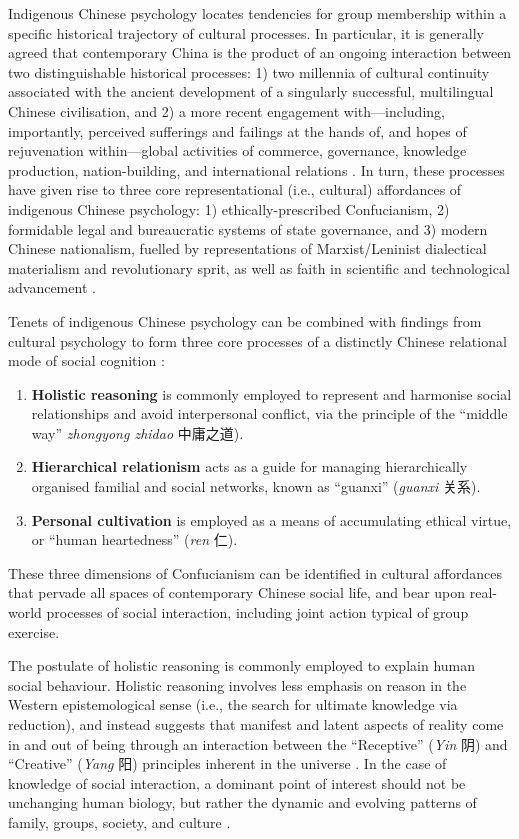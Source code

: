 \begin{CJK}{UTF8}{gbsn}
Indigenous Chinese psychology locates tendencies for group membership within a specific historical trajectory of cultural processes.  In particular, it is generally agreed that contemporary China is the product of an ongoing interaction between two distinguishable historical processes: 1) two millennia of cultural continuity associated with the ancient development of a singularly successful, multilingual Chinese civilisation, and 2) a more recent engagement with---including, importantly, perceived sufferings and failings at the hands of, and hopes of rejuvenation within---global activities of commerce, governance, knowledge production, nation-building, and international relations \citep{Liu2009}.  In turn, these processes have given rise to three core representational (i.e., cultural) affordances of indigenous Chinese psychology: 1) ethically-prescribed Confucianism, 2) formidable legal and bureaucratic systems of state governance, and 3) modern Chinese nationalism, fuelled by representations of Marxist/Leninist dialectical materialism and revolutionary sprit, as well as faith in scientific and technological advancement \citep{Barme2009}.

Tenets of indigenous Chinese psychology can be combined with findings from cultural psychology to form three core processes of a distinctly Chinese relational mode of social cognition \citep{Liu2014}:

    \begin{enumerate}
      \item \textbf{Holistic reasoning} is commonly employed to represent and harmonise social relationships and avoid interpersonal conflict, via the principle of the  ``middle way'' \textit{zhongyong zhidao} 中庸之道).
       \item \textbf{Hierarchical relationism} acts as a guide for managing hierarchically organised familial and social networks, known as ``guanxi'' (\textit{guanxi} 关系).
       \item \textbf{Personal cultivation} is employed as a means of accumulating ethical virtue, or ``human heartedness'' (\textit{ren} 仁).
     \end{enumerate}

These three dimensions of Confucianism can be identified in cultural affordances that pervade all spaces of contemporary Chinese social life, and bear upon real-world processes of social interaction, including joint action typical of group exercise.

The postulate of holistic reasoning is commonly employed to explain human social behaviour.  Holistic reasoning involves less emphasis on reason in the Western epistemological sense (i.e., the search for ultimate knowledge via reduction), and instead suggests that manifest and latent aspects of reality come in and out of being through an interaction between the ``Receptive'' (\textit{Yin} 阴) and ``Creative'' (\textit{Yang} 阳) principles inherent in the universe \citep{Leys1997}.  In the case of knowledge of social interaction, a dominant point of interest should not be unchanging human biology, but rather the dynamic and evolving patterns of family, groups, society, and culture \cite{Nisbett2003}.


\end{CJK}
